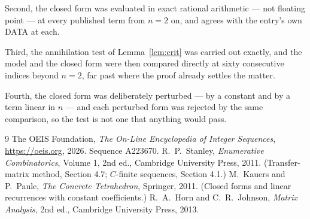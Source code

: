 \documentclass[11pt,a4paper]{article}
\theoremstyle{plain}
\theoremstyle{definition}
\begin{document}
Second, the closed form was evaluated in exact rational arithmetic --- not floating point ---
at every published term from $n=2$ on, and agrees with the entry's own DATA at each.

Third, the annihilation test of Lemma~\ref{lem:crit} was carried out exactly, and the model
and the closed form were then compared directly at sixty consecutive indices beyond
$n=2$, far past where the proof already settles the matter.

Fourth, the closed form was deliberately perturbed --- by a constant and by a term linear in
$n$ --- and each perturbed form was rejected by the same comparison, so the test is not one
that anything would pass.

\begin{thebibliography}{9}
 The OEIS Foundation, \emph{The On-Line Encyclopedia of Integer
Sequences}, \url{https://oeis.org}, 2026. Sequence A223670.
 R.~P.~Stanley, \emph{Enumerative Combinatorics}, Volume 1, 2nd ed.,
Cambridge University Press, 2011. (Transfer-matrix method, Section 4.7; $C$-finite sequences,
Section 4.1.)
 M.~Kauers and P.~Paule, \emph{The Concrete Tetrahedron}, Springer, 2011.
(Closed forms and linear recurrences with constant coefficients.)
 R.~A.~Horn and C.~R.~Johnson, \emph{Matrix Analysis}, 2nd ed., Cambridge
University Press, 2013.
\end{thebibliography}
\end{document}
